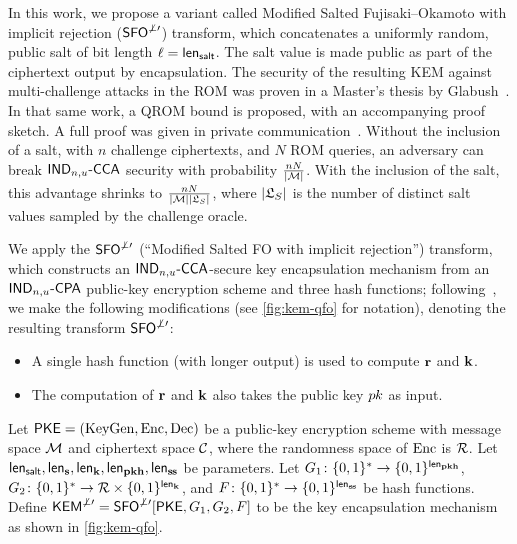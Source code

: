 In this work, we propose a variant called Modified Salted Fujisaki--Okamoto with implicit rejection ($\textsf{\upshape\mdseries SFO}^{\not\perp\prime}$) transform, which concatenates a uniformly random, public salt of bit length $\ell = {\mathsf{len}_{{\mathsf{salt}}}}$. The salt value is made
public as part of the ciphertext output by encapsulation. The security of the resulting KEM against multi-challenge attacks in the ROM was proven in a Master's thesis by Glabush~\cite{GlabushThesis}. In that same work, a QROM bound is proposed, with an accompanying proof sketch. A full proof was given in private communication~\cite{Multi-challenge}. Without the inclusion of a salt, with $n$ challenge ciphertexts, and $N$ ROM queries, an adversary can break $\textsf{\upshape\mdseries IND}_{n,u}\text{-}\textsf{\upshape\mdseries CCA}$ security with probability $\frac{nN}{|\mathcal{M}|}$. With the inclusion of the salt, this advantage shrinks to $\frac{nN}{|\mathcal{M}||\mathfrak{L}_{S}|}$, where $|\mathfrak{L}_{S}|$ is the number of distinct salt values sampled by the challenge oracle.

We apply the $\textsf{\upshape\mdseries SFO}^{\not\perp\prime}$ (``Modified Salted FO with implicit
rejection'') transform, which constructs an $\textsf{\upshape\mdseries IND}_{n,u}\text{-}\textsf{\upshape\mdseries CCA}$-secure key
encapsulation mechanism from an $\textsf{\upshape\mdseries IND}_{n,u}\text{-}\textsf{\upshape\mdseries CPA}$ public-key encryption scheme
and three hash functions; following~\cite{EuroSP:Kyber}, we make the
following modifications (see \autoref{fig:kem-qfo} for notation),
denoting the resulting transform $\textsf{\upshape\mdseries SFO}^{\not\perp\prime}$:
\begin{itemize}
\item A single hash function (with longer output) is used to compute $\mathbf{r}$ and $\mathbf{k}$.
\item The computation of $\mathbf{r}$ and $\mathbf{k}$ also takes the public key $p\mkern-0.5muk$ as input.
\end{itemize}

\begin{definition}
  \label{def:qfo}
  Let $\textsf{\upshape\mdseries PKE}=(\textrm{\upshape\mdseries KeyGen},\textrm{\upshape\mdseries Enc},\textrm{\upshape\mdseries Dec})$ be a public-key encryption scheme
  with message space $\mathcal{M}$ and ciphertext space $\mathcal{C}$, where
  the randomness space of $\textrm{\upshape\mdseries Enc}$ is $\mathcal{R}$.  Let
  ${\mathsf{len}_{{\mathsf{salt}}}}, {\mathsf{len}_{\mathbf{s}}}, {\mathsf{len}_{\mathbf{k}}}, {\mathsf{len}_{\mathbf{p}\mathbf{k}\mathbf{h}}}, {\mathsf{len}_{\mathbf{s}\mkern-1mu\mathbf{s}}}$ be parameters.  Let
  $G_1\colon \{0,1\}^* \to \{0,1\}^{\mathsf{len}_{\mathbf{p}\mathbf{k}\mathbf{h}}}$,
  $G_2\colon \{0,1\}^* \to \mathcal{R} \times \{0,1\}^{\mathsf{len}_{\mathbf{k}}}$, and
  $F\colon \{0,1\}^* \to \{0,1\}^{\mathsf{len}_{\mathbf{s}\mkern-1mu\mathbf{s}}}$ be hash functions.  Define
  $\textsf{\upshape\mdseries KEM}^{\not\perp\prime} = \textsf{\upshape\mdseries SFO}^{\not\perp\prime}[\textsf{\upshape\mdseries PKE},G_1,G_2,F]$ to be the key
  encapsulation mechanism as shown in \autoref{fig:kem-qfo}.
\end{definition}

